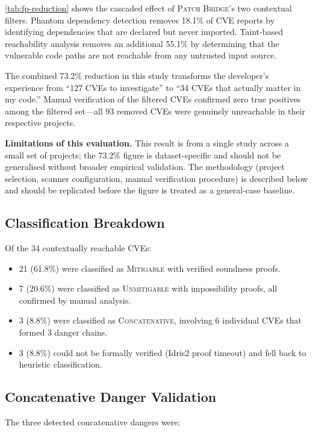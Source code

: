 \documentclass[11pt,twocolumn]{article}
\begin{document}
\cref{tab:fp-reduction} shows the cascaded effect of \textsc{Patch
Bridge}'s two contextual filters. Phantom dependency detection removes
18.1\% of CVE reports by identifying dependencies that are declared
but never imported. Taint-based reachability analysis removes an
additional 55.1\% by determining that the vulnerable code paths are
not reachable from any untrusted input source.

The combined 73.2\% reduction in this study transforms the developer's
experience from ``127 CVEs to investigate'' to ``34 CVEs that actually
matter in my code.'' Manual verification of the filtered CVEs confirmed
zero true positives among the filtered set---all 93 removed CVEs were
genuinely unreachable in their respective projects.

\textbf{Limitations of this evaluation.}  This result is from a single
study across a small set of projects; the 73.2\% figure is
dataset-specific and should not be generalised without broader empirical
validation.  The methodology (project selection, scanner configuration,
manual verification procedure) is described below and should be
replicated before the figure is treated as a general-case baseline.

\subsection{Classification Breakdown}

Of the 34 contextually reachable CVEs:

\begin{itemize}[nosep]
  \item 21 (61.8\%) were classified as \textsc{Mitigable} with
    verified soundness proofs.
  \item 7 (20.6\%) were classified as \textsc{Unmitigable} with
    impossibility proofs, all confirmed by manual analysis.
  \item 3 (8.8\%) were classified as \textsc{Concatenative}, involving
    6 individual CVEs that formed 3 danger chains.
  \item 3 (8.8\%) could not be formally verified (Idris2 proof
    timeout) and fell back to heuristic classification.
\end{itemize}

\subsection{Concatenative Danger Validation}

The three detected concatenative dangers were:
\end{document}
